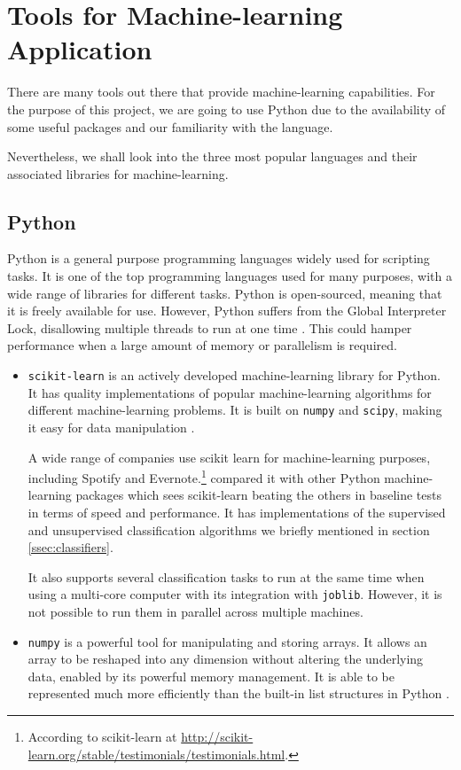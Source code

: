 \newpage
\section{Tools for Machine-learning Application} \label{sec:lit-tools}
There are many tools out there that provide machine-learning capabilities. For the purpose of this project, we are going to use Python due to the availability of some useful packages and our familiarity with the language. 

Nevertheless, we shall look into the three most popular languages and their associated libraries for machine-learning. 

\subsection{Python}
Python is a general purpose programming languages widely used for scripting tasks. It is one of the top programming languages used for many purposes, with a wide range of libraries for different tasks. Python is open-sourced, meaning that it is freely available for use. However, Python suffers from the Global Interpreter Lock, disallowing multiple threads to run at one time \cite{gil}. This could hamper performance when a large amount of memory or parallelism is required.

\begin{itemize}
  \item \texttt{scikit-learn} is an actively developed machine-learning library for Python. It has quality implementations of popular machine-learning algorithms for different machine-learning problems. It is built on \texttt{numpy} and \texttt{scipy}, making it easy for data manipulation \cite{scikit-learn-paper}. 
    
A wide range of companies use scikit learn for machine-learning purposes, including Spotify and Evernote.\footnote{According to scikit-learn at \url{http://scikit-learn.org/stable/testimonials/testimonials.html}.}  compared it with other Python machine-learning packages which sees scikit-learn beating the others in baseline tests in terms of speed and performance. It has implementations of the supervised and unsupervised classification algorithms we briefly mentioned in section \ref{ssec:classifiers}.

It also supports several classification tasks to run at the same time when using a multi-core computer with its integration with \texttt{joblib}. However, it is not possible to run them in parallel across multiple machines.

  \item \texttt{numpy} is a powerful tool for manipulating and storing arrays. It allows an array to be reshaped into any dimension without altering the underlying data, enabled by its powerful memory management. It is able to be represented much more efficiently than the built-in list structures in Python \cite{numpy}.
\end{itemize}

